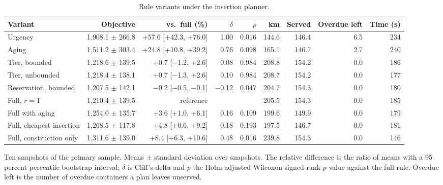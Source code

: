 \begin{table}[!htbp]
\caption{Rule variants under the insertion planner.}
\label{tab:ablation}
\centering
\footnotesize
\setlength{\tabcolsep}{2pt}
\begin{tabular}{lrrrrrrrr}
\toprule
Variant & Objective & vs.\ full (\%) & $\delta$ & $p$ & km & Served & Overdue left & Time (s) \\
\midrule
Urgency & 1{,}908.1 $\pm$ 266.8 & +57.6 [+42.3, +76.0] & 1.00 & 0.016 & 144.6 & 146.4 & 6.5 & 234 \\
Aging & 1{,}511.2 $\pm$ 303.4 & +24.8 [+10.8, +39.2] & 0.76 & 0.098 & 165.1 & 146.7 & 2.7 & 240 \\
Tier, bounded & 1{,}218.6 $\pm$ 139.5 & +0.7 [\ensuremath{-}1.2, +2.6] & 0.08 & 0.984 & 208.8 & 154.2 & 0.0 & 186 \\
Tier, unbounded & 1{,}218.4 $\pm$ 138.1 & +0.7 [\ensuremath{-}1.3, +2.6] & 0.10 & 0.984 & 208.7 & 154.2 & 0.0 & 177 \\
Reservation, bounded & 1{,}207.5 $\pm$ 142.1 & \ensuremath{-}0.2 [\ensuremath{-}0.5, \ensuremath{-}0.1] & \ensuremath{-}0.12 & 0.047 & 204.7 & 154.3 & 0.0 & 180 \\
Full, $r = 1$ & 1{,}210.4 $\pm$ 139.5 & reference &  &  & 205.5 & 154.3 & 0.0 & 185 \\
Full with aging & 1{,}254.0 $\pm$ 135.7 & +3.6 [+1.0, +6.1] & 0.16 & 0.109 & 199.6 & 149.9 & 0.0 & 179 \\
Full, cheapest insertion & 1{,}268.5 $\pm$ 117.8 & +4.8 [+0.6, +9.2] & 0.18 & 0.193 & 197.5 & 146.7 & 0.0 & 181 \\
Full, construction only & 1{,}311.6 $\pm$ 139.0 & +8.4 [+6.3, +10.6] & 0.48 & 0.016 & 239.8 & 154.3 & 0.0 & 146 \\
\bottomrule
\end{tabular}
\par\smallskip\footnotesize Ten snapshots of the primary sample. Means $\pm$ standard deviation over snapshots. The relative difference is the ratio of means with a 95 percent percentile bootstrap interval; $\delta$ is Cliff's delta and $p$ the Holm-adjusted Wilcoxon signed-rank $p$-value against the full rule. Overdue left is the number of overdue containers a plan leaves unserved.
\end{table}

